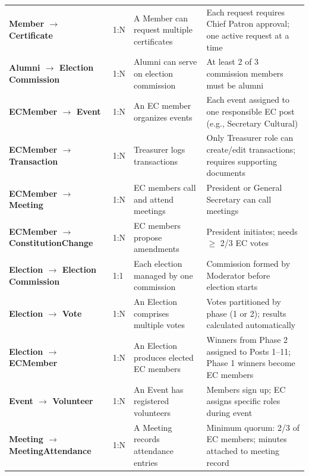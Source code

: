 \documentclass[12pt,a4paper]{article}
\begin{document}
\begin{center}
\begin{longtable}{>{\columncolor{AccentBlue}\color{black}\bfseries\small}p{4cm}%
                  >{\small}p{2.3cm}%
                  >{\small}p{3.5cm}%
                  >{\small}p{6cm}}
Member $\rightarrow$ Certificate & 1:N & A Member can request multiple certificates & Each request requires Chief Patron approval; one active request at a time \\[2pt]

\rowcolor{LightBlue}Alumni $\rightarrow$ Election Commission & 1:N & Alumni can serve on election commission & At least 2 of 3 commission members must be alumni \\[2pt]

ECMember $\rightarrow$ Event & 1:N & An EC member organizes events & Each event assigned to one responsible EC post (e.g., Secretary Cultural) \\[2pt]

\rowcolor{LightBlue}ECMember $\rightarrow$ Transaction & 1:N & Treasurer logs transactions & Only Treasurer role can create/edit transactions; requires supporting documents \\[2pt]

ECMember $\rightarrow$ Meeting & 1:N & EC members call and attend meetings & President or General Secretary can call meetings \\[2pt]

\rowcolor{LightBlue}ECMember $\rightarrow$ ConstitutionChange & 1:N & EC members propose amendments & President initiates; needs $\geq$ 2/3 EC votes \\[2pt]

Election $\rightarrow$ Election Commission & 1:1 & Each election managed by one commission & Commission formed by Moderator before election starts \\[2pt]

\rowcolor{LightBlue}Election $\rightarrow$ Vote & 1:N & An Election comprises multiple votes & Votes partitioned by phase (1 or 2); results calculated automatically \\[2pt]

Election $\rightarrow$ ECMember & 1:N & An Election produces elected EC members & Winners from Phase 2 assigned to Posts 1--11; Phase 1 winners become EC members \\[2pt]

\rowcolor{LightBlue}Event $\rightarrow$ Volunteer & 1:N & An Event has registered volunteers & Members sign up; EC assigns specific roles during event \\[2pt]

Meeting $\rightarrow$ MeetingAttendance & 1:N & A Meeting records attendance entries & Minimum quorum: 2/3 of EC members; minutes attached to meeting record \\[2pt]


\end{longtable}
\end{center}
\end{document}
